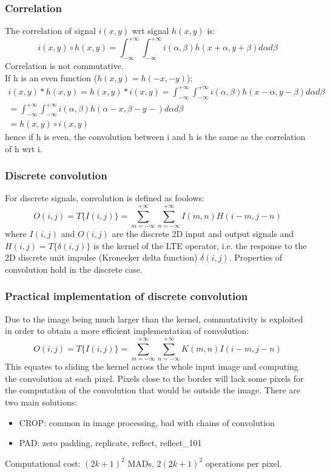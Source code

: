 \documentclass{article}
\begin{document}
\subsubsection{Correlation}
The correlation of signal $i(x,y)$ wrt signal $h(x,y)$ is:
$$i(x,y)\circ h(x,y) = \int_{-\infty}^{+\infty} \int_{-\infty}^{+\infty} i(\alpha,\beta)h(x+\alpha,y+\beta)d\alpha d\beta$$
Correlation is not commutative.\\
If h is an even function ($h(x,y)=h(-x,-y)$):
\begin{gather*}
    i(x,y)*h(x,y)=h(x,y)*i(x,y)=\int_{-\infty}^{+\infty} \int_{-\infty}^{+\infty} i(\alpha,\beta)h(x-\alpha,y-\beta)d\alpha d\beta\\
    = \int_{-\infty}^{+\infty} \int_{-\infty}^{+\infty} i(\alpha,\beta)h(\alpha-x,\beta-y-)d\alpha d\beta\\
    = h(x,y) \circ i(x,y)
\end{gather*}
hence if h is even, the convolution between i and h is the same as the correlation of h wrt i.
\subsubsection{Discrete convolution}
For discrete signals, convolution is defined as foolows:
\begin{equation}
    O(i,j)=T\{I(i,j)\}=\sum_{m=-\infty}^{+\infty} \sum_{n=-\infty}^{+\infty} I(m,n)H(i-m,j-n)
\end{equation}
where $I(i,j)$ and $O(i,j)$ are the discrete 2D input and output signals and $H(i,j)=T\{\delta(i,j)\}$ is the kernel of the LTE operator, i.e. the response to the 2D discrete unit impulse (Kronecker delta function) $\delta(i,j)$. Properties of convolution hold in the discrete case.
\subsubsection{Practical implementation of discrete convolution}
Due to the image being much larger than the kernel, commutativity is exploited in order to obtain a more efficient implementation of convolution:
\begin{equation}
    O(i,j)=T\{I(i,j)\}=\sum_{m=-\infty}^{+\infty} \sum_{n=-\infty}^{+\infty} K(m,n)I(i-m,j-n)
\end{equation}
This equates to sliding the kernel across the whole input image and computing the convolution at each pixel. Pixels close to the border will lack some pixels for the computation of the convolution that would be outside the image. There are two main solutions:
\begin{itemize}
    \item CROP: common in image processing, bad with chains of convolution
    \item PAD: zero padding, replicate, reflect, reflect\_101
\end{itemize}
Computational cost: $(2k+1)^2$ MADs, $2(2k+1)^2$ operations per pixel.
\end{document}
